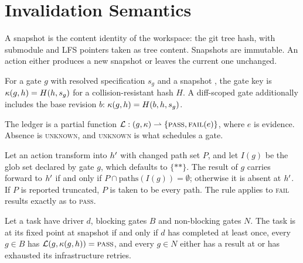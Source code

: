 \section{Invalidation Semantics}
\label{app:semantics}


\begin{definition}[Snapshot]
  A snapshot \snapshot{} is the content identity of the workspace: the git
  tree hash, with submodule and LFS pointers taken as tree content. Snapshots
  are immutable. An action either produces a new snapshot or leaves the
  current one unchanged.
\end{definition}

\begin{definition}
  For a gate \(g\) with resolved specification \(s_g\) and a snapshot
  \snapshot{}, the gate key is \(\kappa(g, h) = H(h, s_g)\)
  for a collision-resistant hash \(H\). A diff-scoped gate additionally
  includes the base revision \(b\): \(\kappa(g, h) = H(b, h,
  s_g)\).
\end{definition}

\begin{definition}[Ledger]
  The ledger is a partial function
  \(\mathcal{L} : (g, \kappa) \rightharpoonup \{\textsc{pass}, \textsc{fail}(e)\}\),
  where \(e\) is evidence. Absence is \textsc{unknown}, and \textsc{unknown}
  is what schedules a gate.
\end{definition}

\begin{definition}[Invalidation]
  Let an action transform \snapshot{} into \(h'\) with changed path
  set \(P\), and let \(I(g)\) be the glob set declared by gate \(g\), which
  defaults to \(\{\texttt{**}\}\). The result of \(g\) carries forward to
  \(h'\) if and only if \(P \cap \mathrm{paths}(I(g)) = \emptyset\);
  otherwise it is absent at \(h'\). If \(P\) is reported truncated,
  \(P\) is taken to be every path. The rule applies to \textsc{fail} results
  exactly as to \textsc{pass}.
\end{definition}

\begin{definition}
  Let a task have driver \(d\), blocking gates \(B\) and non-blocking gates
  \(N\). The task is at its fixed point at snapshot \snapshot{} if and only if
  \(d\) has completed at least once, every \(g \in B\) has
  \(\mathcal{L}(g, \kappa(g, h)) = \textsc{pass}\), and every
  \(g \in N\) either has a result at \snapshot{} or has exhausted its
  infrastructure retries.
\end{definition}

